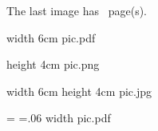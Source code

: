 \hbox{\pdfrefximage \pdflastximage}


The last image has \the\pdflastximagepages\ page(s).


\pdfximage width 6cm {pic.pdf}  %
\pdfrefximage \pdflastximage    %

\pdfximage height 4cm {pic.png} %

\edef\MyImg{\the\pdflastximage} %
\pdfrefximage\MyImg

\pdfximage width 6cm height 4cm %
   {pic.jpg}                    %

=\hbox{\pdfrefximage\pdflastximage} %
=.06         %
\pdfximage              %
    width  {pic.pdf}  %
\pdfrefximage \pdflastximage

